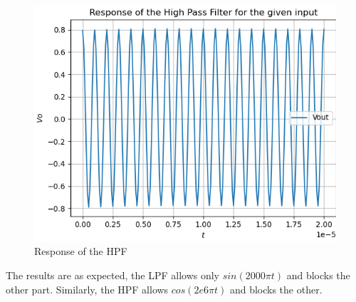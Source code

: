 \documentclass[11pt, a4paper]{article}
\begin{document}
    \begin{figure}[!h]
        \centering
        \includegraphics[scale = 0.65]{Figure 6.png}
        \caption{Response of the HPF}
        \label{fig:Figure 6}
    \end{figure}
    The results are as expected, the LPF allows only $sin(2000\pi t)$ and blocks the other part. Similarly, the HPF allows $cos(2e6\pi t)$ and blocks the other.
\end{document}

